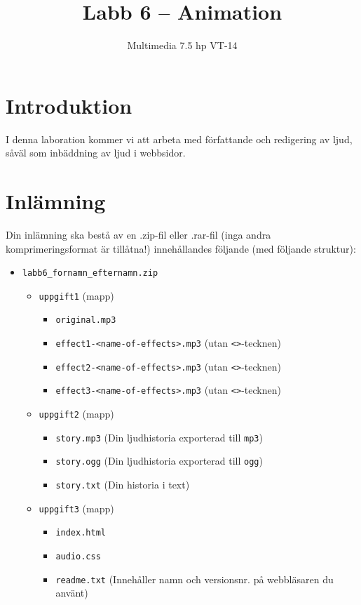 \documentclass[12pt]{article}
\date{}
\title{ Labb 6 -- Animation }
\author{ Multimedia 7.5 hp VT-14 }
\begin{document}
\maketitle
\vspace{-3.5em}




\section{Introduktion}
I denna laboration kommer vi att arbeta med författande och redigering av ljud, såväl som inbäddning av ljud i webbsidor.

\section{Inlämning}
Din inlämning ska bestå av en .zip-fil eller .rar-fil (inga andra komprimeringsformat är tillåtna!) innehållandes följande (med följande struktur):
  \begin{itemize}
    \item \texttt{labb6\_fornamn\_efternamn.zip}
      \vspace{-0.5em}
      \begin{itemize}
        \item \texttt{uppgift1} (mapp)
          \begin{itemize}
            \item \texttt{original.mp3}
            \item \texttt{effect1-<name-of-effects>.mp3} (utan \texttt{<>}-tecknen)
            \item \texttt{effect2-<name-of-effects>.mp3} (utan \texttt{<>}-tecknen)
            \item \texttt{effect3-<name-of-effects>.mp3} (utan \texttt{<>}-tecknen)
          \end{itemize}
        \item \texttt{uppgift2} (mapp)
          \begin{itemize}
            \item \texttt{story.mp3} (Din ljudhistoria exporterad till \texttt{mp3})
            \item \texttt{story.ogg} (Din ljudhistoria exporterad till \texttt{ogg})
            \item \texttt{story.txt} (Din historia i text)
          \end{itemize}
        \item \texttt{uppgift3} (mapp)
          \begin{itemize}
            \item \texttt{index.html}
            \item \texttt{audio.css}
            \item \texttt{readme.txt} (Innehåller namn och versionsnr. på webbläsaren du använt)
          \end{itemize}
    \end{itemize}
  \end{itemize}
\end{document}
